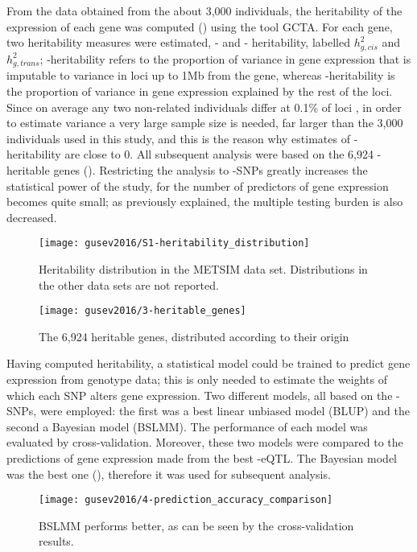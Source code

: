 \documentclass[../main.tex]{subfiles}
\begin{document}
From the data obtained from the about 3,000 individuals, the 
heritability of the expression of each gene was computed 
() using the tool GCTA\cite{Yang2011}. For each 
gene, two heritability measures were estimated, \cis- and \trans- 
heritability, labelled $h_{g,cis}^2$ and $h_{g,trans}^2$; 
\cis-heritability refers to the proportion of variance in gene 
expression that is imputable to variance in loci up to 1Mb from the 
gene, whereas \trans-heritability is the proportion of variance in gene 
expression explained by the rest of the loci. Since on average any two 
non-related individuals differ at 0.1\% of loci \cite{Auton2015}, in 
order to estimate \trans variance a very large sample size is needed, 
far larger than the 3,000 individuals used in this study, and this is 
the reason why estimates of \trans-heritability are close to 0. All 
subsequent analysis were based on the 6,924 \cis-heritable genes 
(). Restricting the analysis to \cis-SNPs greatly 
increases the statistical power of the study, for the number of 
predictors of gene expression becomes quite small; as previously 
explained, the multiple testing burden is also decreased.

\begin{figure}
	\texttt{[image: gusev2016/S1-heritability\_distribution]}
	\caption{Heritability distribution in the METSIM data set. 
		Distributions in the other data sets are not reported.}
\end{figure}

\begin{figure}
	\texttt{[image: gusev2016/3-heritable\_genes]}
	\caption{The 6,924 heritable genes, distributed according to their 
origin}
\end{figure}

Having computed heritability, a statistical model could be trained to 
predict gene expression from genotype data; this is only needed to 
estimate the weights of which each SNP alters gene expression. Two 
different models, all based on the \cis-SNPs, were employed: the first 
was a best linear unbiased model (BLUP) and the second a Bayesian model 
(BSLMM). The performance of each model was evaluated by 
cross-validation. Moreover, these two models were compared to the 
predictions of gene expression made from the best \cis-eQTL. The 
Bayesian model was the best one (), therefore it was 
used for subsequent analysis.

\begin{figure}
	\texttt{[image: gusev2016/4-prediction\_accuracy\_comparison]}
	\caption{BSLMM performs better, as can be seen by the 
		cross-validation results.}
\end{figure}
\end{document}
